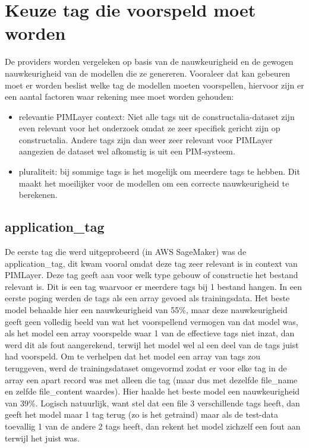 \section{Keuze tag die voorspeld moet worden}
De providers worden vergeleken op basis van de nauwkeurigheid en de gewogen nauwkeurigheid van de modellen die ze genereren. Vooraleer dat kan gebeuren moet er worden beslist welke tag de modellen moeten voorspellen, hiervoor zijn er een aantal factoren waar rekening mee moet worden gehouden: 
\begin{itemize}
    \item relevantie PIMLayer context: Niet alle tags uit de constructalia-dataset zijn even relevant voor het onderzoek omdat ze zeer specifiek gericht zijn op constructalia. Andere tags zijn dan weer zeer relevant voor PIMLayer aangezien de dataset wel afkomstig is uit een PIM-systeem.
    \item pluraliteit: bij sommige tags is het mogelijk om meerdere tags te hebben. Dit maakt het moeilijker voor de modellen om een correcte nauwkeurigheid te berekenen. 
\end{itemize}

\subsection{application\_tag}
De eerste tag die werd uitgeprobeerd (in AWS SageMaker) was de application\_tag, dit kwam vooral omdat deze tag zeer relevant is in context van PIMLayer. Deze tag geeft aan voor welk type gebouw of constructie het bestand relevant is. Dit is een tag waarvoor er meerdere tags bij 1 bestand hangen. In een eerste poging werden de tags als een array gevoed als trainingsdata. Het beste model behaalde hier een nauwkeurigheid van 55\%, maar deze nauwkeurigheid geeft geen volledig beeld van wat het voorspellend vermogen van dat model was, als het model een array voorspelde waar 1 van de effectieve tags niet inzat, dan werd dit als fout aangerekend, terwijl het model wel al een deel van de tags juist had voorspeld. Om te verhelpen dat het model een array van tags zou teruggeven, werd de trainingsdataset omgevormd zodat er voor elke tag in de array een apart record was met alleen die tag (maar dus met dezelfde file\_name en zelfde file\_content waardes). Hier haalde het beste model een nauwkeurigheid van  39\%. Logisch natuurlijk, want stel dat een file 3 verschillende tags heeft, dan geeft het model maar 1 tag terug (zo is het getraind) maar als de test-data toevallig 1 van de andere 2 tags heeft, dan rekent het model zichzelf een fout aan terwijl het juist was. 

